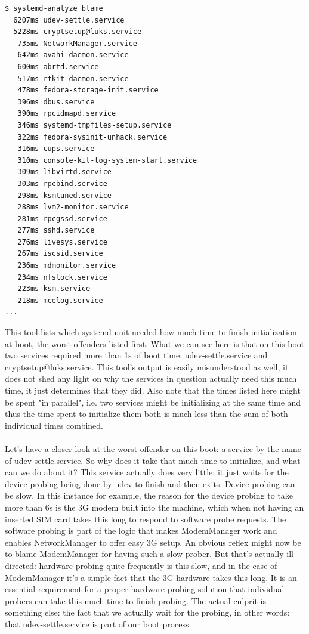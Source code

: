 \documentclass[titlepage]{article}
\begin{document}
\newpage
\begin{lstlisting}
$ systemd-analyze blame
  6207ms udev-settle.service
  5228ms cryptsetup@luks.service
   735ms NetworkManager.service
   642ms avahi-daemon.service
   600ms abrtd.service
   517ms rtkit-daemon.service
   478ms fedora-storage-init.service
   396ms dbus.service
   390ms rpcidmapd.service
   346ms systemd-tmpfiles-setup.service
   322ms fedora-sysinit-unhack.service
   316ms cups.service
   310ms console-kit-log-system-start.service
   309ms libvirtd.service
   303ms rpcbind.service
   298ms ksmtuned.service
   288ms lvm2-monitor.service
   281ms rpcgssd.service
   277ms sshd.service
   276ms livesys.service
   267ms iscsid.service
   236ms mdmonitor.service
   234ms nfslock.service
   223ms ksm.service
   218ms mcelog.service
...
\end{lstlisting}
This tool lists which systemd unit needed how much time to finish initialization at boot, the worst offenders listed first. What we can see here is that on this boot two services required more than 1s of boot time: udev-settle.service and cryptsetup@luks.service. This tool's output is easily misunderstood as well, it does not shed any light on why the services in question actually need this much time, it just determines that they did. Also note that the times listed here might be spent "in parallel", i.e. two services might be initializing at the same time and thus the time spent to initialize them both is much less than the sum of both individual times combined.
\\
\\
Let's have a closer look at the worst offender on this boot: a service by the name of udev-settle.service. So why does it take that much time to initialize, and what can we do about it? This service actually does very little: it just waits for the device probing being done by udev to finish and then exits. Device probing can be slow. In this instance for example, the reason for the device probing to take more than 6s is the 3G modem built into the machine, which when not having an inserted SIM card takes this long to respond to software probe requests. The software probing is part of the logic that makes ModemManager work and enables NetworkManager to offer easy 3G setup. An obvious reflex might now be to blame ModemManager for having such a slow prober. But that's actually ill-directed: hardware probing quite frequently is this slow, and in the case of ModemManager it's a simple fact that the 3G hardware takes this long. It is an essential requirement for a proper hardware probing solution that individual probers can take this much time to finish probing. The actual culprit is something else: the fact that we actually wait for the probing, in other words: that udev-settle.service is part of our boot process.
\end{document}
